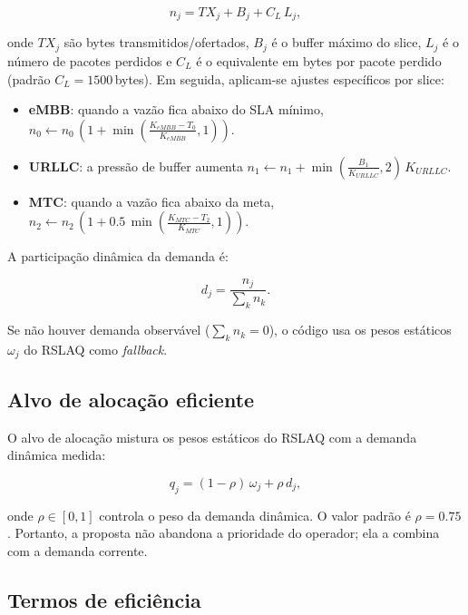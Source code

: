 \documentclass[10pt,a4paper]{IEEEtran}
\begin{document}
\begin{equation}
n_j = TX_j + B_j + C_L\,L_j,
\label{eq:raw_need}
\end{equation}

onde $TX_j$ s\~{a}o bytes transmitidos/ofertados, $B_j$ \'{e} o
buffer m\'{a}ximo do slice, $L_j$ \'{e} o n\'{u}mero de pacotes
perdidos e $C_L$ \'{e} o equivalente em bytes por pacote
perdido (padr\~{a}o $C_L=1500$\,bytes). Em seguida, aplicam-se
ajustes espec\'{i}ficos por slice:

\begin{itemize}
\item \textbf{eMBB}: quando a vaz\~{a}o fica abaixo do SLA
  m\'{i}nimo, $n_0 \leftarrow n_0\,(1+\min(\frac{K_{\textit{eMBB}} - T_0}{K_{\textit{eMBB}}}, 1))$.
\item \textbf{URLLC}: a press\~{a}o de buffer aumenta
  $n_1 \leftarrow n_1 + \min(\frac{B_1}{K_{\textit{URLLC}}}, 2)\,K_{\textit{URLLC}}$.
\item \textbf{MTC}: quando a vaz\~{a}o fica abaixo da meta,
  $n_2 \leftarrow n_2\,(1+0.5\,\min(\frac{K_{\textit{MTC}} - T_2}{K_{\textit{MTC}}}, 1))$.
\end{itemize}

A participa\c{c}\~{a}o din\^{a}mica da demanda \'{e}:

\begin{equation}
d_j = \frac{n_j}{\sum_k n_k}.
\label{eq:demand_share}
\end{equation}

Se n\~{a}o houver demanda observ\'{a}vel ($\sum_k n_k = 0$),
o c\'{o}digo usa os pesos est\'{a}ticos $\omega_j$ do RSLAQ
como \emph{fallback}.

\subsection{Alvo de aloca\c{c}\~{a}o eficiente}

O alvo de aloca\c{c}\~{a}o mistura os pesos est\'{a}ticos do
RSLAQ com a demanda din\^{a}mica medida:

\begin{equation}
q_j = (1 - \rho)\,\omega_j + \rho\,d_j,
\label{eq:need_share}
\end{equation}

onde $\rho \in [0,1]$ controla o peso da demanda
din\^{a}mica. O valor padr\~{a}o \'{e} $\rho=0.75$.
Portanto, a proposta n\~{a}o abandona a prioridade do operador;
ela a combina com a demanda corrente.

\subsection{Termos de efici\^{e}ncia}
\end{document}
